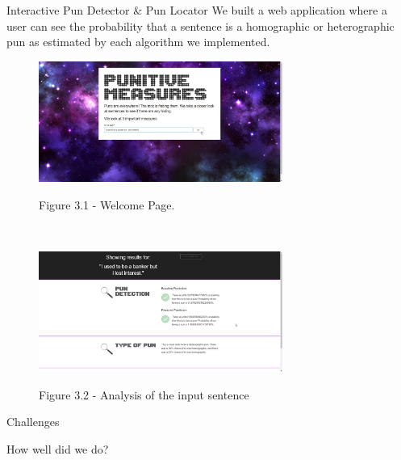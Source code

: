 \documentclass[final]{beamer}
\newlength{\sepwid}
\newlength{\onecolwid}
\begin{document}
\begin{frame}[t]
\begin{columns}[t]
\begin{column}{\onecolwid}
			\begin{block}{Interactive Pun Detector \& Pun Locator}
				\large{
					We built a web application where a user can see the probability that a sentence is a homographic or heterographic pun as estimated by each algorithm we implemented.
				}

				\begin{figure}
				\centering
				\includegraphics[width=0.75\textwidth]{UI_1.jpg}\\
				\caption{Figure 3.1 - Welcome Page.}
				\end{figure}
				\\
				\vspace{20mm}
				\begin{figure}
				\centering
				\includegraphics[width=0.75\textwidth]{UI_2.png}\\
				\centering
				\caption{Figure 3.2 - Analysis of the input sentence}
				\end{figure}
			\end{block}
			\vspace{20mm}
            \begin{block}{Challenges}
            \end{block}
            \vspace{20mm}
            \begin{block}{How well did we do?}
            \end{block}
		\end{column}
		\begin{column}{\sepwid}\end{column}
	\end{columns}
\end{frame}
\end{document}
